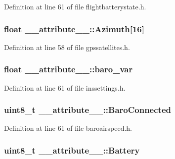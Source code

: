 \-Definition at line 61 of file flightbatterystate.\-h.

\hypertarget{struct____attribute_____a70fc868ad4e4068426d332b8eacfbd6f}{
\subsubsection[{\-Azimuth}]{\setlength{\rightskip}{0pt plus 5cm}float {\bf \-\_\-\-\_\-attribute\-\_\-\-\_\-\-::\-Azimuth}\mbox{[}16\mbox{]}}}\label{struct____attribute_____a70fc868ad4e4068426d332b8eacfbd6f}


\-Definition at line 58 of file gpssatellites.\-h.

\hypertarget{struct____attribute_____a5133c37e14f3e4f7ee9779f506dfa6f7}{
\subsubsection[{baro\-\_\-var}]{\setlength{\rightskip}{0pt plus 5cm}float {\bf \-\_\-\-\_\-attribute\-\_\-\-\_\-\-::baro\-\_\-var}}}\label{struct____attribute_____a5133c37e14f3e4f7ee9779f506dfa6f7}


\-Definition at line 61 of file inssettings.\-h.

\hypertarget{struct____attribute_____af518dbbc7f1a8cb5d1541d3cc4724376}{
\subsubsection[{\-Baro\-Connected}]{\setlength{\rightskip}{0pt plus 5cm}uint8\-\_\-t {\bf \-\_\-\-\_\-attribute\-\_\-\-\_\-\-::\-Baro\-Connected}}}\label{struct____attribute_____af518dbbc7f1a8cb5d1541d3cc4724376}


\-Definition at line 61 of file baroairspeed.\-h.

\hypertarget{struct____attribute_____ada52c8c66ceb855635231dfd60cebfca}{
\subsubsection[{\-Battery}]{\setlength{\rightskip}{0pt plus 5cm}uint8\-\_\-t {\bf \-\_\-\-\_\-attribute\-\_\-\-\_\-\-::\-Battery}}}\label{struct____attribute_____ada52c8c66ceb855635231dfd60cebfca}



